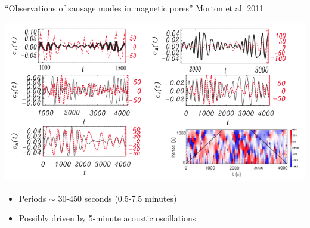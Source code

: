 \documentclass[11pt,table]{beamer}
\begin{document}
\begin{frame}[t]{``Observations of sausage modes in magnetic pores''}
    {Morton et al. 2011}
    \begin{block}{}
        \includegraphics[width=\textwidth]{saus2.png}
    \end{block}
    \begin{itemize}
        \item Periods $\sim$ 30{-}450 seconds (0.5{-}7.5 minutes)
        \item Possibly driven by 5-minute acoustic oscillations
    \end{itemize}
\end{frame}%
\end{document}
